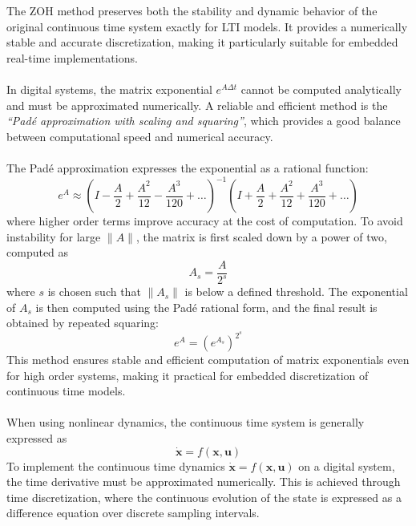 The ZOH method preserves both the stability and dynamic behavior of the original continuous time system exactly for LTI models. It provides a numerically stable and accurate discretization, making it particularly suitable for embedded real-time implementations.  
\\ \\
In digital systems, the matrix exponential $e^{A\Delta t}$ cannot be computed analytically and must be approximated numerically. A reliable and efficient method is the \textit{``Padé approximation with scaling and squaring''}, which provides a good balance between computational speed and numerical accuracy.  
\\ \\
The Padé approximation expresses the exponential as a rational function:
\begin{equation}
    e^{A} \approx \left(I - \frac{A}{2} + \frac{A^2}{12} - \frac{A^3}{120} + \dots \right)^{-1}
                  \left(I + \frac{A}{2} + \frac{A^2}{12} + \frac{A^3}{120} + \dots \right)
    \label{eq:pade1}
\end{equation}
where higher order terms improve accuracy at the cost of computation. To avoid instability for large $\|A\|$, the matrix is first scaled down by a power of two, computed as
\begin{equation}
    A_s = \frac{A}{2^s}
    \label{eq:pade2}
\end{equation}
where $s$ is chosen such that $\|A_s\|$ is below a defined threshold. The exponential of $A_s$ is then computed using the Padé rational form, and the final result is obtained by repeated squaring:
\begin{equation}
    e^A = (e^{A_s})^{2^s}
    \label{eq:pade3}
\end{equation}
This method ensures stable and efficient computation of matrix exponentials even for high order systems, making it practical for embedded discretization of continuous time models.  
\\ \\
When using nonlinear dynamics, the continuous time system is generally expressed as
$$
    \dot{\mathbf{x}} = f(\mathbf{x}, \mathbf{u})
$$
To implement the continuous time dynamics $\dot{\mathbf{x}} = f(\mathbf{x}, \mathbf{u})$ on a digital system, the time derivative must be approximated numerically. This is achieved through time discretization, where the continuous evolution of the state is expressed as a difference equation over discrete sampling intervals.  
\\ \\
